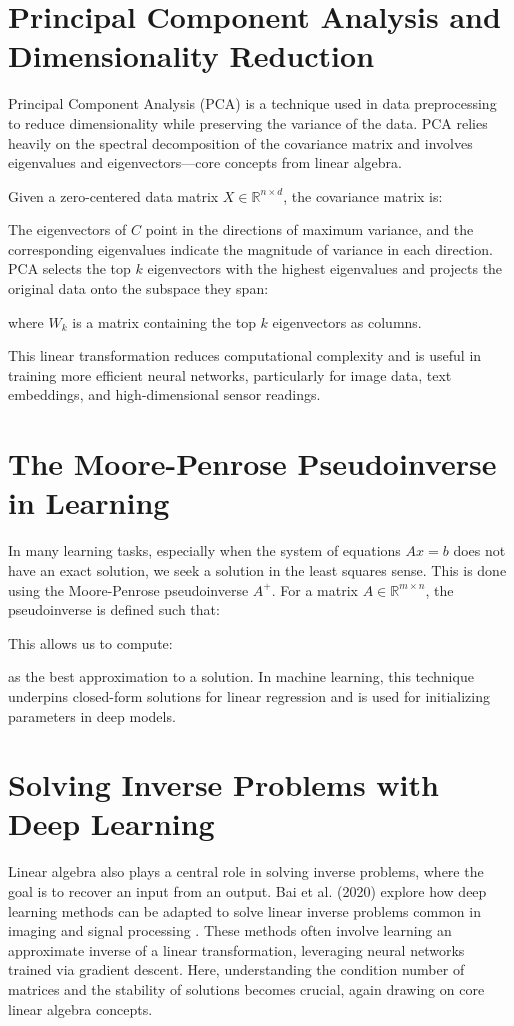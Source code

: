 \documentclass{article}
\begin{document}

\section{Principal Component Analysis and Dimensionality Reduction}
Principal Component Analysis (PCA) is a technique used in data preprocessing to reduce dimensionality while preserving the variance of the data. PCA relies heavily on the spectral decomposition of the covariance matrix and involves eigenvalues and eigenvectors—core concepts from linear algebra.

Given a zero-centered data matrix $X \in \mathbb{R}^{n \times d}$, the covariance matrix is:

The eigenvectors of $C$ point in the directions of maximum variance, and the corresponding eigenvalues indicate the magnitude of variance in each direction. PCA selects the top $k$ eigenvectors with the highest eigenvalues and projects the original data onto the subspace they span:

where $W_k$ is a matrix containing the top $k$ eigenvectors as columns.

This linear transformation reduces computational complexity and is useful in training more efficient neural networks, particularly for image data, text embeddings, and high-dimensional sensor readings.


\section{The Moore-Penrose Pseudoinverse in Learning}
In many learning tasks, especially when the system of equations $Ax = b$ does not have an exact solution, we seek a solution in the least squares sense. This is done using the Moore-Penrose pseudoinverse $A^+$. For a matrix $A \in \mathbb{R}^{m \times n}$, the pseudoinverse is defined such that:

This allows us to compute:

as the best approximation to a solution. In machine learning, this technique underpins closed-form solutions for linear regression and is used for initializing parameters in deep models.


\section{Solving Inverse Problems with Deep Learning}
Linear algebra also plays a central role in solving inverse problems, where the goal is to recover an input from an output. Bai et al. (2020) explore how deep learning methods can be adapted to solve linear inverse problems common in imaging and signal processing \cite{bai2020inverse}. These methods often involve learning an approximate inverse of a linear transformation, leveraging neural networks trained via gradient descent. Here, understanding the condition number of matrices and the stability of solutions becomes crucial, again drawing on core linear algebra concepts.
\end{document}
